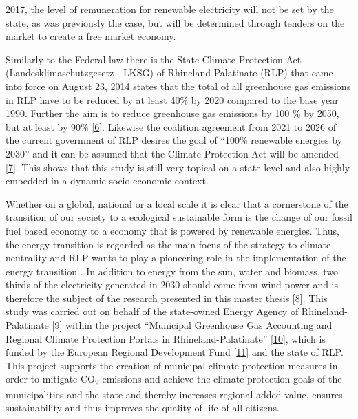 \documentclass[a4paper,11pt]{article}
\begin{document}
2017, the level of remuneration for renewable electricity will not be set by the state, as was previously the case, but will be determined through tenders on the market to create a free market economy.

Similarly to the Federal law there is the State Climate Protection Act (Landesklimaschutzgesetz - LKSG) of Rhineland-Palatinate (RLP) that came into force on August 23, 2014 states that the total of all greenhouse gas emissions in RLP have to be reduced by at least 40\% by 2020 compared to the base year 1990. Further the aim is to reduce greenhouse gas emissions by 100 \% by 2050, but at least by 90\% {[}\protect\hyperlink{ref-RheinlandPfalz.19.08.2014}{6}{]}. Likewise the coalition agreement from 2021 to 2026 of the current government of RLP desires the goal of ``100\% renewable energies by 2030'' and it can be assumed that the Climate Protection Act will be amended {[}\protect\hyperlink{ref-SPDGruneFDP.2021}{7}{]}. This shows that this study is still very topical on a state level and also highly embedded in a dynamic socio-economic context.

Whether on a global, national or a local scale it is clear that a cornerstone of the transition of our society to a ecological sustainable form is the change of our fossil fuel based economy to a economy that is powered by renewable energies. Thus, the energy transition is regarded as the main focus of the strategy to climate neutrality and RLP wants to play a pioneering role in the implementation of the energy transition . In addition to energy from the sun, water and biomass, two thirds of the electricity generated in 2030 should come from wind power and is therefore the subject of the research presented in this master thesis {[}\protect\hyperlink{ref-LandesregierungRheinlandPfalz.2021}{8}{]}. This study was carried out on behalf of the state-owned Energy Agency of Rhineland-Palatinate {[}\protect\hyperlink{ref-EnergieagenturRheinlandPfalz.2021}{9}{]} within the project ``Municipal Greenhouse Gas Accounting and Regional Climate Protection Portals in Rhineland-Palatinate'' {[}\protect\hyperlink{ref-KomBiReK.2021}{10}{]}, which is funded by the European Regional Development Fund {[}\protect\hyperlink{ref-EuropeanRegionalDevelopmentFund.2021}{11}{]} and the state of RLP. This project supports the creation of municipal climate protection measures in order to mitigate CO\textsubscript{2} emissions and achieve the climate protection goals of the municipalities and the state and thereby increases regional added value, ensures sustainability and thus improves the quality of life of all citizens.
\end{document}
